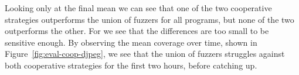 Looking only at the final mean we can see that one of the two cooperative
strategies outperforms the union of fuzzers for all programs, but none of the
two outperforms the other. For \djpeg we see that the differences are too small
to be sensitive enough. By observing the mean coverage over time, shown in
Figure~\ref{fig:eval-coop-djpeg}, we see that the union of fuzzers struggles
against both cooperative strategies for the first two hours, before catching up.

\begin{figure}[h]
    \centering%
    \begin{adjustbox}{center}
    \end{adjustbox}
    \begin{adjustbox}{center}
\end{adjustbox}
\end{figure}
